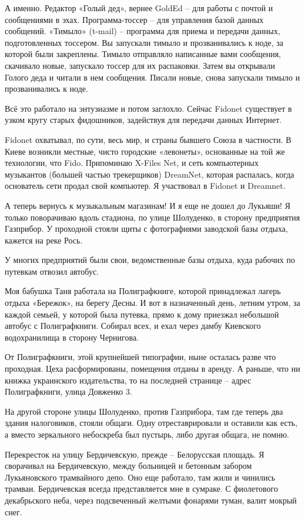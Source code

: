 А именно. Редактор «Голый дед», вернее GoldEd – для работы с почтой и сообщениями в эхах. Программа-тоссер – для управления базой данных сообщений. «Тимыло» (t-mail) – программа для приема и передачи данных, подготовленных тоссером. Вы запускали тимыло и прозванивались к ноде, за которой были закреплены. Тимыло отправляло написанные вами сообщения, скачивало новые, запускало тоссер для их распаковки. Затем вы открывали Голого деда и читали в нем сообщения. Писали  новые, снова запускали тимыло и прозванивались к ноде. 

Всё это работало на энтузиазме и потом заглохло. Сейчас Fidonet существует в узком кругу старых фидошников, задействуя для передачи данных Интернет.

Fidonet охватывал, по сути, весь мир, и страны бывшего Союза в частности. В Киеве возникли местные, чисто городские «левонеты», основанные на той же технологии, что Fido. Припоминаю X-Files Net, и сеть компьютерных музыкантов (большей частью трекерщиков) DreamNet, которая распалась, когда основатель сети продал свой компьютер. Я участвовал в Fidonet и Dreamnet.

А теперь вернусь к музыкальным магазинам! И я еще не дошел до Лукьяши! Я только поворачиваю вдоль стадиона, по улице Шолуденко, в сторону предприятия Газприбор. У проходной стояли щиты с фотографиями заводской базы отдыха, кажется на реке Рось.

У многих предприятий были свои, ведомственные базы отдыха, куда рабочих по путевкам отвозил автобус. 

Моя бабушка Таня работала на Полиграфкниге, которой принадлежал лагерь отдыха «Бережок», на берегу Десны. И вот в назначенный день, летним утром, за каждой семьей, у которой была путевка, прямо к дому приезжал небольшой автобус с Полиграфкниги. Собирал всех, и ехал через дамбу Киевского водохранилища в сторону Чернигова.

От Полиграфкниги, этой крупнейшей типографии, ныне осталась разве что проходная. Цеха  расформированы, помещения отданы в аренду. А раньше, что ни книжка украинского издательства, то на последней странице – адрес Полиграфкниги, улица Довженко 3.

На другой стороне улицы Шолуденко, против Газприбора, там где теперь два здания налоговиков, стояли общаги. Одну отреставрировали и оставили как есть, а вместо зеркального небоскреба был пустырь, либо другая общага, не помню.

Перекресток на улицу Бердичевскую, прежде – Белорусская площадь. Я сворачивал на Бердичевскую, между больницей и бетонным забором Лукьяновского трамвайного депо. Оно еще работало, там жили и чинились трамваи. Бердичевская всегда представляется мне в сумраке. С фиолетового декабрьского неба, через подсвеченный желтыми фонарями туман, валит мокрый снег.

